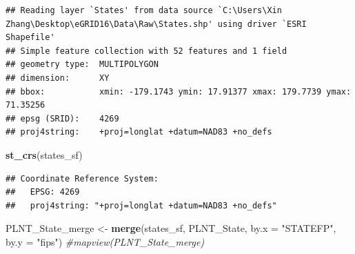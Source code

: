 \documentclass[12pt,]{article}
\newenvironment{Shaded}{\begin{snugshade}}{\end{snugshade}}
\newcommand{\KeywordTok}[1]{\textcolor[rgb]{0.13,0.29,0.53}{\textbf{#1}}}
\newcommand{\DataTypeTok}[1]{\textcolor[rgb]{0.13,0.29,0.53}{#1}}
\newcommand{\StringTok}[1]{\textcolor[rgb]{0.31,0.60,0.02}{#1}}
\newcommand{\CommentTok}[1]{\textcolor[rgb]{0.56,0.35,0.01}{\textit{#1}}}
\newcommand{\OperatorTok}[1]{\textcolor[rgb]{0.81,0.36,0.00}{\textbf{#1}}}
\newcommand{\NormalTok}[1]{#1}
\begin{document}
\begin{Shaded}
\end{Shaded}

\begin{verbatim}
## Reading layer `States' from data source `C:\Users\Xin Zhang\Desktop\eGRID16\Data\Raw\States.shp' using driver `ESRI Shapefile'
## Simple feature collection with 52 features and 1 field
## geometry type:  MULTIPOLYGON
## dimension:      XY
## bbox:           xmin: -179.1743 ymin: 17.91377 xmax: 179.7739 ymax: 71.35256
## epsg (SRID):    4269
## proj4string:    +proj=longlat +datum=NAD83 +no_defs
\end{verbatim}

\begin{Shaded}
\begin{Highlighting}[]
\KeywordTok{st_crs}\NormalTok{(states_sf)}
\end{Highlighting}
\end{Shaded}

\begin{verbatim}
## Coordinate Reference System:
##   EPSG: 4269 
##   proj4string: "+proj=longlat +datum=NAD83 +no_defs"
\end{verbatim}

\begin{Shaded}
\begin{Highlighting}[]
\NormalTok{PLNT_State_merge <-}\StringTok{ }\KeywordTok{merge}\NormalTok{(states_sf, PLNT_State, }\DataTypeTok{by.x =} \StringTok{"STATEFP"}\NormalTok{, }\DataTypeTok{by.y =} \StringTok{"fips"}\NormalTok{)}
\CommentTok{#mapview(PLNT_State_merge)}
\end{Highlighting}
\end{Shaded}
\end{document}
